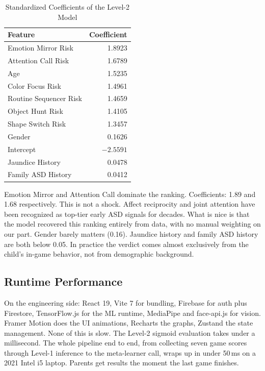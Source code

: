 \documentclass[conference]{IEEEtran}
\begin{document}
\begin{table}[htbp]
\caption{Standardized Coefficients of the Level-2 Model}
\label{tab:coefficients}
\centering
\renewcommand{\arraystretch}{1.15}
\begin{tabular}{@{}lr@{}}
\toprule
\textbf{Feature} & \textbf{Coefficient} \\
\midrule
Emotion Mirror Risk      & 1.8923 \\
Attention Call Risk      & 1.6789 \\
Age                      & 1.5235 \\
Color Focus Risk         & 1.4961 \\
Routine Sequencer Risk   & 1.4659 \\
Object Hunt Risk         & 1.4105 \\
Shape Switch Risk        & 1.3457 \\
Gender                   & 0.1626 \\
Intercept                & $-2.5591$ \\
Jaundice History         & 0.0478 \\
Family ASD History       & 0.0412 \\
\bottomrule
\end{tabular}
\end{table}

Emotion Mirror and Attention Call dominate the ranking. Coefficients: 1.89 and 1.68 respectively. This is not a shock. Affect reciprocity and joint attention have been recognized as top-tier early ASD signals for decades. What is nice is that the model recovered this ranking entirely from data, with no manual weighting on our part. Gender barely matters (0.16). Jaundice history and family ASD history are both below 0.05. In practice the verdict comes almost exclusively from the child's in-game behavior, not from demographic background.

\subsection{Runtime Performance}
On the engineering side: React 19, Vite 7 for bundling, Firebase for auth plus Firestore, TensorFlow.js for the ML runtime, MediaPipe and face-api.js for vision. Framer Motion does the UI animations, Recharts the graphs, Zustand the state management. None of this is slow. The Level-2 sigmoid evaluation takes under a millisecond. The whole pipeline end to end, from collecting seven game scores through Level-1 inference to the meta-learner call, wraps up in under 50\,ms on a 2021 Intel i5 laptop. Parents get results the moment the last game finishes.
\end{document}
